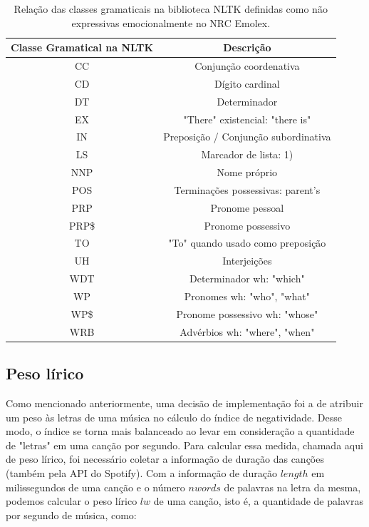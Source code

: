 \begin{table}[h]
	\centering
	\begin{tabular}{|c|c|}
		\hline
		\textbf{Classe Gramatical na NLTK} & \textbf{Descrição} \\ \hline
		CC & Conjunção coordenativa \\ \hline
		CD & Dígito cardinal \\ \hline
		DT & Determinador \\ \hline
		EX & "There" existencial: "there is" \\ \hline
		IN & Preposição / Conjunção subordinativa \\ \hline
		LS & Marcador de lista: 1) \\ \hline
		NNP & Nome próprio \\ \hline
		POS & Terminações possessivas: parent's \\ \hline
		PRP & Pronome pessoal \\ \hline
		PRP\$ & Pronome possessivo \\ \hline
		TO & "To" quando usado como preposição \\ \hline
		UH & Interjeições \\ \hline
		WDT & Determinador wh: "which" \\ \hline
		WP & Pronomes wh: "who", "what" \\ \hline
		WP\$ & Pronome possessivo wh: "whose" \\ \hline
		WRB & Advérbios wh: "where", "when" \\ \hline
	\end{tabular}
	\caption{\label{tab:nonexppos} Relação das classes gramaticais na
	biblioteca NLTK definidas como não expressivas emocionalmente no
	NRC Emolex.}
\end{table}

\subsection{Peso lírico} \label{subsec:lw}

Como mencionado anteriormente, uma decisão de implementação foi a de
atribuir um peso às letras de uma música no cálculo do índice de
negatividade. Desse modo, o índice se torna mais balanceado ao levar
em consideração a quantidade de "letras" em uma canção por segundo.
Para calcular essa medida, chamada aqui de peso lírico, foi necessário
coletar a informação de duração das canções (também pela API do Spotify).
Com a informação de duração $ length $ em milissegundos de uma canção
e o número $ nwords $ de palavras na letra da mesma, podemos calcular
o peso lírico $ lw $ de uma canção, isto é, a quantidade de palavras por
 segundo de música, como:

